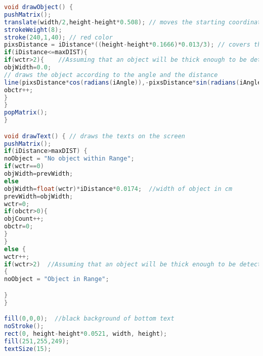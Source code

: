 \begin{mdframed}[backgroundcolor=light-gray, roundcorner=10pt,leftmargin=1, rightmargin=1, innerleftmargin=15, innertopmargin=15,innerbottommargin=15, outerlinewidth=1, linecolor=light-gray]
\begin{lstlisting}[caption={The Processing Code}, language=Java]
void drawObject() {
pushMatrix();
translate(width/2,height-height*0.508); // moves the starting coordinats to new location
strokeWeight(8);
stroke(240,1,40); // red color
pixsDistance = iDistance*((height-height*0.1666)*0.013/3); // covers the distance from the sensor from cm to pixels
if(iDistance<=maxDIST){
if(wctr>2){    //Assuming that an object will be thick enough to be detected for 2 degrees of rotation.
objWidth=0.0;
// draws the object according to the angle and the distance
line(pixsDistance*cos(radians(iAngle)),-pixsDistance*sin(radians(iAngle)),(width-width*0.505)*cos(radians(iAngle)),-(width-width*0.505)*sin(radians(iAngle)));
obctr++;
}
}
popMatrix();
}

void drawText() { // draws the texts on the screen
pushMatrix();
if(iDistance>maxDIST) {
noObject = "No object within Range";
if(wctr==0)
objWidth=prevWidth;
else
objWidth=float(wctr)*iDistance*0.0174;  //width of object in cm
prevWidth=objWidth;
wctr=0;
if(obctr>0){
objCount++;
obctr=0;
}
}
else {
wctr++;
if(wctr>2)  //Assuming that an object will be thick enough to be detected for 2 degrees of rotation.
{
noObject = "Object in Range";

}
} 

fill(0,0,0);  //black background of bottom text
noStroke();
rect(0, height-height*0.0521, width, height);
fill(251,255,249);
textSize(15);


\end{lstlisting}
\end{mdframed}
